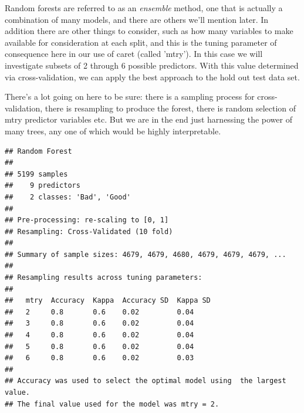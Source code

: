 \documentclass[english,nohyper,titlepage]{tufte-handout}\usepackage{knitr}
\begin{document}
Random forests are referred to as an \emph{ensemble} method, one that is actually a combination of many models, and there are others we'll mention later.  In addition there are other things to consider, such as how many variables to make available for consideration at each split, and this is the tuning parameter of consequence here in our use of caret (called 'mtry').  In this case we will investigate subsets of 2 through 6 possible predictors. With this value determined via cross-validation, we can apply the best approach to the hold out test data set.

There's a lot going on here to be sure: there is a sampling process for cross-validation, there is resampling to produce the forest, there is random selection of mtry predictor variables etc.  But we are in the end just harnessing the power of many trees, any one of which would be highly interpretable.


\begin{knitrout}\footnotesize
{}\color{fgcolor}\begin{kframe}
\begin{alltt}
\hlstd{(}\hlstd{)}
 \hlkwb{=} \hlstd{(}\hlstd{=}\hlstd{(}\hlopt{:}\hlstd{))}
 \hlkwb{=} \hlopt{~}  \hlstd{=}\hlstd{,}
                   \hlstd{=}\hlstd{,} 
                   \hlstd{=}\hlstd{)}
\end{alltt}
\begin{verbatim}
## Random Forest 
## 
## 5199 samples
##    9 predictors
##    2 classes: 'Bad', 'Good' 
## 
## Pre-processing: re-scaling to [0, 1] 
## Resampling: Cross-Validated (10 fold) 
## 
## Summary of sample sizes: 4679, 4679, 4680, 4679, 4679, 4679, ... 
## 
## Resampling results across tuning parameters:
## 
##   mtry  Accuracy  Kappa  Accuracy SD  Kappa SD
##   2     0.8       0.6    0.02         0.04    
##   3     0.8       0.6    0.02         0.04    
##   4     0.8       0.6    0.02         0.04    
##   5     0.8       0.6    0.02         0.04    
##   6     0.8       0.6    0.02         0.03    
## 
## Accuracy was used to select the optimal model using  the largest value.
## The final value used for the model was mtry = 2.
\end{verbatim}
\end{kframe}
\end{knitrout}
\end{document}
